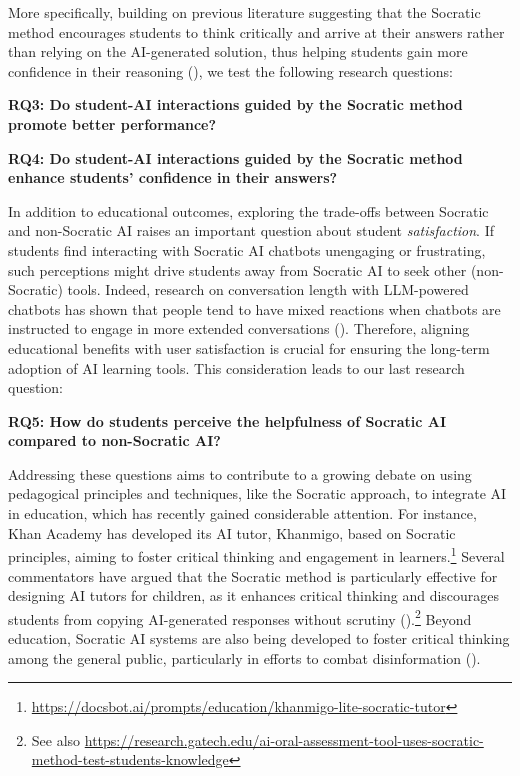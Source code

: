 \documentclass[
  12pt,
]{article}
\begin{document}
More specifically, building on previous literature suggesting that the Socratic method encourages students to think critically and arrive at their answers rather than relying on the AI-generated solution, thus helping students gain more confidence in their reasoning (), we test the following research questions:

\textbf{RQ3: Do student-AI interactions guided by the Socratic method promote better performance?}

\textbf{RQ4: Do student-AI interactions guided by the Socratic method enhance students' confidence in their answers?}

In addition to educational outcomes, exploring the trade-offs between Socratic and non-Socratic AI raises an important question about student \emph{satisfaction}. If students find interacting with Socratic AI chatbots unengaging or frustrating, such perceptions might drive students away from Socratic AI to seek other (non-Socratic) tools. Indeed, research on conversation length with LLM-powered chatbots has shown that people tend to have mixed reactions when chatbots are instructed to engage in more extended conversations (). Therefore, aligning educational benefits with user satisfaction is crucial for ensuring the long-term adoption of AI learning tools. This consideration leads to our last research question:

\textbf{RQ5: How do students perceive the helpfulness of Socratic AI compared to non-Socratic AI?}

Addressing these questions aims to contribute to a growing debate on using pedagogical principles and techniques, like the Socratic approach, to integrate AI in education, which has recently gained considerable attention. For instance, Khan Academy has developed its AI tutor, Khanmigo, based on Socratic principles, aiming to foster critical thinking and engagement in learners.\footnote{\url{https://docsbot.ai/prompts/education/khanmigo-lite-socratic-tutor}} Several commentators have argued that the Socratic method is particularly effective for designing AI tutors for children, as it enhances critical thinking and discourages students from copying AI-generated responses without scrutiny ().\footnote{See also \url{https://research.gatech.edu/ai-oral-assessment-tool-uses-socratic-method-test-students-knowledge}} Beyond education, Socratic AI systems are also being developed to foster critical thinking among the general public, particularly in efforts to combat disinformation ().
\end{document}
